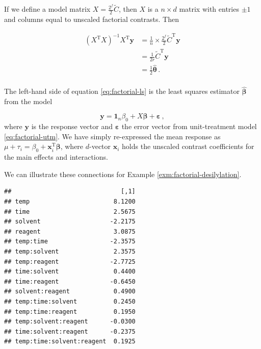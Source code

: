 \documentclass[
]{book}
\newenvironment{Shaded}{\begin{snugshade}}{\end{snugshade}}
\newcommand{\DecValTok}[1]{\textcolor[rgb]{0.00,0.00,0.81}{#1}}
\newcommand{\FunctionTok}[1]{\textcolor[rgb]{0.00,0.00,0.00}{#1}}
\newcommand{\NormalTok}[1]{#1}
\newcommand{\OtherTok}[1]{\textcolor[rgb]{0.56,0.35,0.01}{#1}}
\newcommand{\SpecialCharTok}[1]{\textcolor[rgb]{0.00,0.00,0.00}{#1}}
\theoremstyle{definition}
\theoremstyle{definition}
\theoremstyle{definition}
\theoremstyle{definition}
\theoremstyle{remark}
\begin{document}
If we define a model matrix \(X = \frac{2^{f}}{2}\tilde{C}\), then \(X\) is a \(n\times d\) matrix with entries \(\pm 1\) and columns equal to unscaled factorial contrasts. Then

\begin{align}
\left(X^{\mathrm{T}}X\right)^{-1}X^{\mathrm{T}}\boldsymbol{y}& = \frac{1}{n} \times \frac{2^f}{2}\tilde{C}^{\mathrm{T}}\boldsymbol{y}\label{eq:factorial-ls}\\
& = \frac{1}{2r}\tilde{C}^{\mathrm{T}}\boldsymbol{y}\\
& = \frac{1}{2}\hat{\boldsymbol{\theta}}\,. \\
\end{align}

The left-hand side of equation \eqref{eq:factorial-ls} is the least squares estimator \(\hat{\boldsymbol{\beta}}\) from the model

\[
\boldsymbol{y}= \boldsymbol{1}_n\beta_0 + X\boldsymbol{\beta} + \boldsymbol{\varepsilon}\,,
\]
where \(\boldsymbol{y}\) is the response vector and \(\boldsymbol{\varepsilon}\) the error vector from unit-treatment model \eqref{eq:factorial-utm}. We have simply re-expressed the mean response as \(\mu + \tau_i = \beta_0 + \boldsymbol{x}_i^{\mathrm{T}}\boldsymbol{\beta}\), where \(d\)-vector \(\boldsymbol{x}_i\) holds the unscaled contrast coefficients for the main effects and interactions.

We can illustrate these connections for Example \ref{exm:factorial-desilylation}.

\begin{Shaded}
\end{Shaded}

\begin{verbatim}
##                              [,1]
## temp                       8.1200
## time                       2.5675
## solvent                   -2.2175
## reagent                    3.0875
## temp:time                 -2.3575
## temp:solvent               2.3575
## temp:reagent              -2.7725
## time:solvent               0.4400
## time:reagent              -0.6450
## solvent:reagent            0.4900
## temp:time:solvent          0.2450
## temp:time:reagent          0.1950
## temp:solvent:reagent      -0.0300
## time:solvent:reagent      -0.2375
## temp:time:solvent:reagent  0.1925
\end{verbatim}
\end{document}
